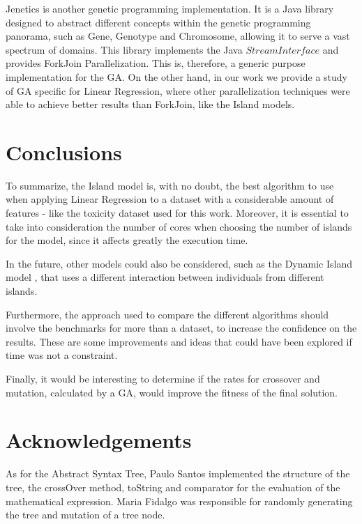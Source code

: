 \documentclass[runningheads]{llncs}
\begin{document}
Jenetics \cite{jenetics} is another genetic programming implementation. It is a Java library designed to abstract different concepts within the genetic programming panorama, such as Gene, Genotype and Chromosome, allowing it to serve a vast spectrum of domains. This library implements the Java $Stream Interface$ and provides ForkJoin Parallelization. This is, therefore, a generic purpose implementation for the GA. On the other hand, in our work we provide a study of GA specific for Linear Regression, where other parallelization techniques were able to achieve better results than ForkJoin, like the Island models.

\section{Conclusions}

To summarize, the Island model is, with no doubt,  the best algorithm to use when applying Linear Regression to a dataset with a considerable amount of features - like the toxicity dataset used for this work. Moreover, it is essential to take into consideration the number of cores when choosing the number of islands for the model, since it affects greatly the execution time.

In the future, other models could also be considered, such as the Dynamic Island model \cite{meng2017dynamic}, that uses a different interaction between individuals from different islands.

Furthermore, the approach used to compare the different algorithms should involve the benchmarks for more than a dataset, to increase the confidence on the results. These are some improvements and ideas that could have been explored if time was not a constraint.

Finally, it would be interesting to determine if the rates for crossover and mutation, calculated by a GA, would  improve the fitness of the final solution.

\section*{Acknowledgements}

As for the Abstract Syntax Tree, Paulo Santos implemented the structure of the tree, the crossOver method, toString and comparator for the evaluation of the mathematical expression. Maria Fidalgo was responsible for randomly generating the tree and mutation of a tree node.
\end{document}

